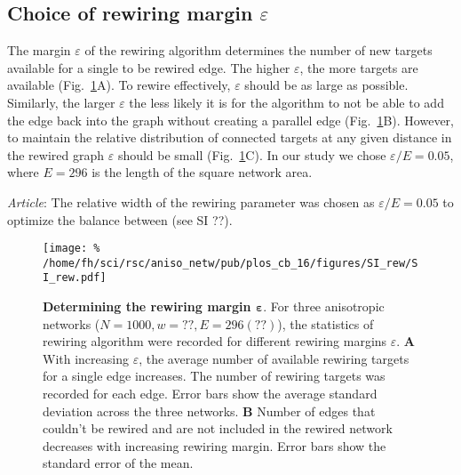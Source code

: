 
\subsection*{Choice of rewiring margin $\varepsilon$}

The margin $\varepsilon$ of the rewiring algorithm determines the number of new targets available for a single to be rewired edge. The higher $\varepsilon$, the more targets are available (Fig.~\ref{fig:rew-ddcp-ef}A). To rewire effectively, $\varepsilon$ should be as large as possible. Similarly, the larger $\varepsilon$ the less likely it is for the algorithm to not be able to add the edge back into the graph without creating a parallel edge (Fig.~\ref{fig:rew-ddcp-ef}B). However, to maintain the relative distribution of connected targets at any given distance in the rewired graph $\varepsilon$ should be small (Fig.~\ref{fig:rew-ddcp-ef}C). In our study we chose $\varepsilon/E = 0.05$, where $E=296$ is the length of the square network area.



\textit{Article}: The relative width of the rewiring parameter was chosen as $\varepsilon / E = 0.05$ to optimize the balance between (see SI ??).


\begin{figure}[h!]
  \texttt{[image: \%
    /home/fh/sci/rsc/aniso\_netw/pub/plos\_cb\_16/figures/SI\_rew/SI\_rew.pdf]}
  \caption{\textbf{Determining the rewiring margin $\bm{\varepsilon}$}. For three anisotropic networks ($N=1000, w=??, E= 296 (??)$), the statistics of rewiring algorithm were recorded for different rewiring margins $\varepsilon$.
    \textbf{A} With increasing $\varepsilon$, the average number of available rewiring targets for a single edge increases. The number of rewiring targets was recorded for each edge. Error bars show the average standard deviation across the three networks.
    \textbf{B} Number of edges that couldn't be rewired and are not included in the rewired network decreases with increasing rewiring margin. Error bars show the standard error of the mean.}
  \label{fig:rew-ddcp-ef}
\end{figure}
